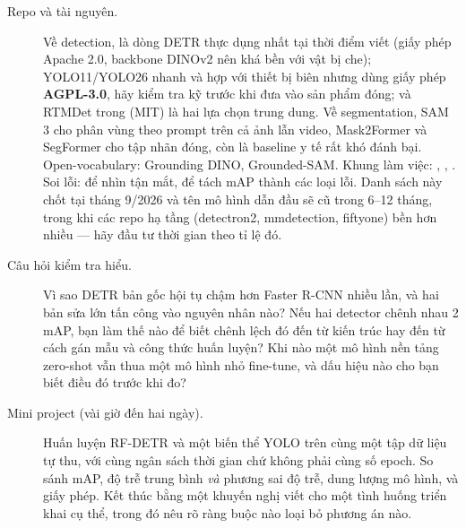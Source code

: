 \documentclass[../../deep_learning.tex]{subfiles}
\begin{document}
\begin{description}
\item[Repo và tài nguyên.] Về detection,  là dòng DETR thực dụng nhất tại thời điểm viết (giấy phép Apache 2.0, backbone DINOv2 nên khá bền với vật bị che);  YOLO11/YOLO26 nhanh và hợp với thiết bị biên nhưng dùng giấy phép \textbf{AGPL-3.0}, hãy kiểm tra kỹ trước khi đưa vào sản phẩm đóng;  và RTMDet trong  (MIT) là hai lựa chọn trung dung. Về segmentation, SAM 3 cho phân vùng theo prompt trên cả ảnh lẫn video, Mask2Former và SegFormer cho tập nhãn đóng, còn  là baseline y tế rất khó đánh bại. Open-vocabulary: Grounding DINO, Grounded-SAM. Khung làm việc: , , . Soi lỗi:  để nhìn tận mắt,  để tách mAP thành các loại lỗi. Danh sách này chốt tại tháng 9/2026 và tên mô hình dẫn đầu sẽ cũ trong 6--12 tháng, trong khi các repo hạ tầng (detectron2, mmdetection, fiftyone) bền hơn nhiều --- hãy đầu tư thời gian theo tỉ lệ đó.
\item[Câu hỏi kiểm tra hiểu.] Vì sao DETR bản gốc hội tụ chậm hơn Faster R-CNN nhiều lần, và hai bản sửa lớn tấn công vào nguyên nhân nào? Nếu hai detector chênh nhau 2 mAP, bạn làm thế nào để biết chênh lệch đó đến từ kiến trúc hay đến từ cách gán mẫu và công thức huấn luyện? Khi nào một mô hình nền tảng zero-shot vẫn thua một mô hình nhỏ fine-tune, và dấu hiệu nào cho bạn biết điều đó trước khi đo?
\item[Mini project (vài giờ đến hai ngày).] Huấn luyện RF-DETR và một biến thể YOLO trên cùng một tập dữ liệu tự thu, với cùng ngân sách thời gian chứ không phải cùng số epoch. So sánh mAP, độ trễ trung bình \emph{và} phương sai độ trễ, dung lượng mô hình, và giấy phép. Kết thúc bằng một khuyến nghị viết cho một tình huống triển khai cụ thể, trong đó nêu rõ ràng buộc nào loại bỏ phương án nào.
\end{description}
\end{document}
